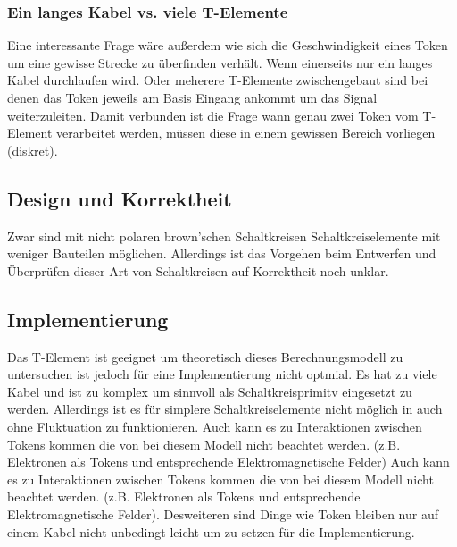 \documentclass[11pt,a4paper]{article}
\begin{document}

\subsubsection{Ein langes Kabel vs. viele T-Elemente}
Eine interessante Frage wäre außerdem wie sich die Geschwindigkeit eines 
Token um eine gewisse Strecke zu überfinden verhält. 
%
Wenn einerseits nur ein langes Kabel durchlaufen wird. 
%
Oder meherere T-Elemente zwischengebaut sind bei denen das Token jeweils
am Basis Eingang ankommt um das Signal weiterzuleiten.
% 
Damit verbunden ist die Frage wann genau zwei Token vom T-Element 
verarbeitet werden, müssen diese in einem gewissen Bereich vorliegen (diskret).


\subsection{Design und Korrektheit}
Zwar sind mit nicht polaren brown'schen Schaltkreisen Schaltkreiselemente mit
weniger Bauteilen möglichen.
%
Allerdings ist das Vorgehen beim Entwerfen und Überprüfen dieser Art von 
Schaltkreisen auf Korrektheit noch unklar. 


\subsection{Implementierung}
Das T-Element ist geeignet um theoretisch dieses Berechnungsmodell zu 
untersuchen ist jedoch für eine Implementierung nicht optmial.
%
Es hat zu viele Kabel und ist zu komplex um sinnvoll als Schaltkreisprimitv
eingesetzt zu werden. 
%
Allerdings ist es für simplere Schaltkreiselemente nicht möglich in auch ohne 
Fluktuation zu funktionieren.
%
Auch kann es zu Interaktionen zwischen Tokens kommen die von bei diesem Modell
nicht beachtet werden. (z.B. Elektronen als Tokens und entsprechende 
Elektromagnetische Felder)
%
Auch kann es zu Interaktionen zwischen Tokens kommen die von bei diesem Modell
nicht beachtet werden. (z.B. Elektronen als Tokens und entsprechende 
Elektromagnetische Felder). Desweiteren sind Dinge wie Token bleiben nur
auf einem Kabel nicht unbedingt leicht um zu setzen für die Implementierung.





\end{document}
